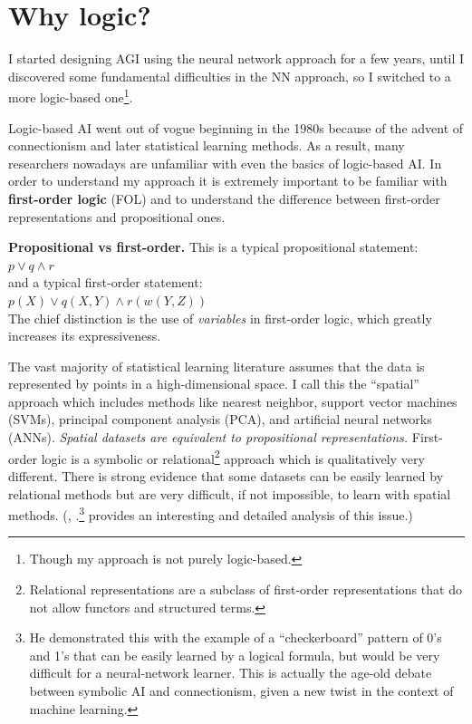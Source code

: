 \section{Why logic?}
\label{sec:why-logic}

I started designing AGI using the neural network approach for a few years, until I discovered some fundamental difficulties in the NN approach, so I switched to a more logic-based one\footnote{Though my approach is not purely logic-based.}.

Logic-based AI went out of vogue beginning in the 1980s because of the advent of connectionism and later statistical learning methods.  As a result, many researchers nowadays are unfamiliar with even the basics of logic-based AI.  In order to understand my approach it is extremely important to be familiar with \textbf{first-order logic} (FOL) and to understand the difference between first-order representations and propositional ones.

\textbf{Propositional vs first-order.}  This is a typical propositional statement:\\
\hspace*{1cm} $ p \vee q \wedge r $\\
and a typical first-order statement:\\
\hspace*{1cm} $ p(X) \vee q(X,Y) \wedge r(w(Y,Z)) $\\
The chief distinction is the use of \emph{variables} in first-order logic, which greatly increases its expressiveness.

The vast majority of statistical learning literature assumes that the data is represented by points in a high-dimensional space.  I call this the ``spatial'' approach which includes methods like nearest neighbor, support vector machines (SVMs), principal component analysis (PCA), and artificial neural networks (ANNs).  \textit{Spatial datasets are equivalent to propositional representations.}  First-order logic is a symbolic or relational\footnote{Relational representations are a subclass of first-order representations that do not allow functors and structured terms.} approach which is qualitatively very different.  There is strong evidence that some datasets can be easily learned by relational methods but are very difficult, if not impossible, to learn with spatial methods.  (\citep*{Thornton1996}, \citep*{Thornton2000}.\footnote{He demonstrated this with the example of a ``checkerboard'' pattern of 0's and 1's that can be easily learned by a logical formula, but would be very difficult for a neural-network learner.  This is actually the age-old debate between symbolic AI and connectionism, given a new twist in the context of machine learning.} provides an interesting and detailed analysis of this issue.)

